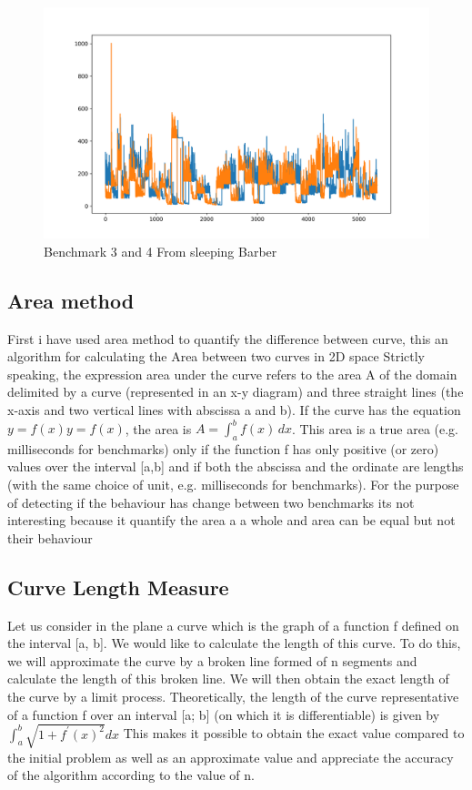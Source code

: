 \documentclass{article}
\begin{document}
\begin{figure}[h!]
    \centering
    \includegraphics[width=1\textwidth]{plot_1.png}
    \caption{Benchmark 3 and 4 From sleeping Barber}
    \label{fig:bench_2_3}
\end{figure}

\subsection{Area method}

First i have used area \cite{jekel2019similarity} method to quantify the difference between curve, this an algorithm for calculating the Area between two curves in 2D space
Strictly speaking, the expression area under the curve refers to the area A of the domain delimited by a curve (represented in an x-y diagram) and three straight lines (the x-axis and two vertical lines with abscissa a and b). If the curve has the equation $y=f(x) y=f(x)$, the area is $A=\int _{a}^{b}f(x)\, {d} x$. This area is a true area (e.g. milliseconds for benchmarks) only if the function f has only positive (or zero) values over the interval [a,b] and if both the abscissa and the ordinate are lengths (with the same choice of unit, e.g. milliseconds for benchmarks).
For the purpose of detecting if the behaviour has change between two benchmarks its not interesting because it quantify the area a a whole and area can be equal but not their behaviour

\subsection{Curve Length Measure}

Let us consider in the plane a curve which is the graph of a function f defined on the interval [a, b]. We would like to calculate the length of this curve. To do this, we will approximate the curve by a broken line formed of n segments and calculate the length of this broken line. We will then obtain the exact length of the curve by a limit process.
Theoretically, the length of the curve representative of a
function f over an interval [a; b] (on which it is differentiable) is given by $\int_{a}^{b} \sqrt{1+f^{\prime}(x)^{2}} d x$
This makes it possible to obtain the exact value compared to the initial problem
as well as an approximate value and appreciate the accuracy of the algorithm
according to the value of n.
\end{document}
